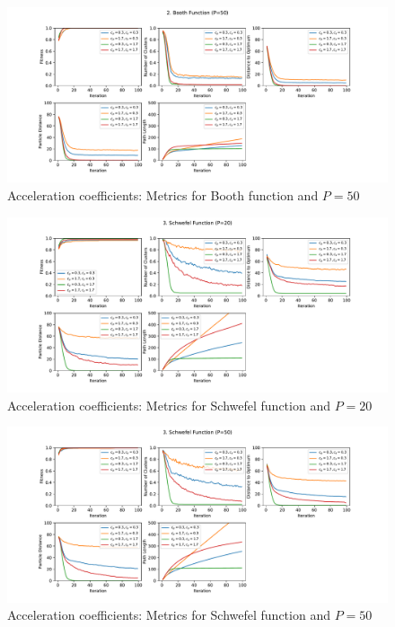 \documentclass[12pt]{article}
\begin{document}
\begin{figure}[h!]
	\centering
	\includegraphics[width=1\textwidth]{figures/ex4/ex4-2-50.pdf}
	\caption{Acceleration coefficients: Metrics for Booth function and $P=50$}
	\label{fig:ex4-2-50}
\end{figure}
\begin{figure}[h!]
	\centering
	\includegraphics[width=1\textwidth]{figures/ex4/ex4-3-20.pdf}
	\caption{Acceleration coefficients: Metrics for Schwefel function and $P=20$}
	\label{fig:ex4-3-20}
\end{figure}
\begin{figure}[h!]
	\centering
	\includegraphics[width=1\textwidth]{figures/ex4/ex4-3-50.pdf}
	\caption{Acceleration coefficients: Metrics for Schwefel function and $P=50$}
	\label{fig:ex4-3-50}
\end{figure}
\end{document}
